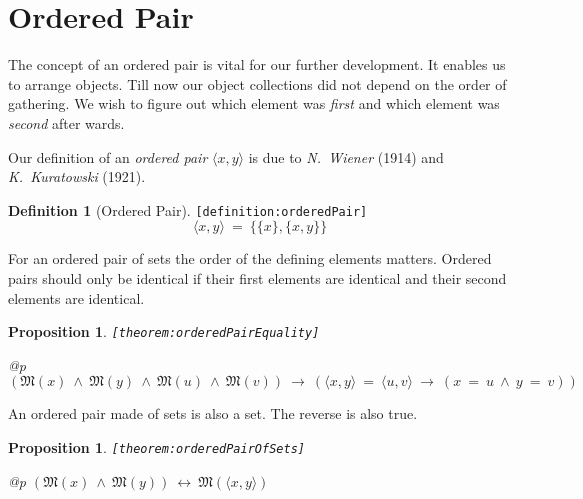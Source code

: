 \documentclass[a4paper,german,10pt,twoside]{book}
\newtheorem{prop}[thm]{Proposition}
\theoremstyle{definition}
\newtheorem{defn}{Definition}
\theoremstyle{remark}
\begin{document}
\section{Ordered Pair} \label{chapter5_section2} \hypertarget{chapter5_section2}{}
The concept of an ordered pair is vital for our further development.
It enables us to arrange objects. Till now our object collections did not depend on the
order of gathering. We wish to figure out which element was \emph{first} and which element
was \emph{second} after wards.

\par
Our definition of an \emph{ordered pair} $\langle x, y\rangle$ is due to  \emph{N.~Wiener} (1914) and \emph{K.~Kuratowski} (1921).

\begin{defn}[Ordered Pair]
\label{definition:orderedPair} \hypertarget{definition:orderedPair}{}
{\tt \tiny [\verb]definition:orderedPair]]}
$$\langle x, y \rangle \ = \ \{ \{ x \}, \{ x, y \} \}$$
\end{defn}


\par
For an ordered pair of sets the order of the defining elements matters.
Ordered pairs should only be identical if their first elements 
are identical and their second elements are identical.

\begin{prop}
\label{theorem:orderedPairEquality} \hypertarget{theorem:orderedPairEquality}{}
{\tt \tiny [\verb]theorem:orderedPairEquality]]}
\mbox{}
\begin{longtable}{{@{\extracolsep{\fill}}p{\linewidth}}}
\centering $(\mathfrak{M}(x)\ \land\ \mathfrak{M}(y)\ \land\ \mathfrak{M}(u)\ \land\ \mathfrak{M}(v))\ \rightarrow\ (\langle x, y \rangle \ = \ \langle u, v \rangle\ \rightarrow\ (x \ = \ u\ \land\ y \ = \ v))$
\end{longtable}

\end{prop}


\par
An ordered pair made of sets is also a set. The reverse is also true.

\begin{prop}
\label{theorem:orderedPairOfSets} \hypertarget{theorem:orderedPairOfSets}{}
{\tt \tiny [\verb]theorem:orderedPairOfSets]]}
\mbox{}
\begin{longtable}{{@{\extracolsep{\fill}}p{\linewidth}}}
\centering $(\mathfrak{M}(x)\ \land\ \mathfrak{M}(y))\ \leftrightarrow\ \mathfrak{M}(\langle x, y \rangle)$
\end{longtable}

\end{prop}
\end{document}
